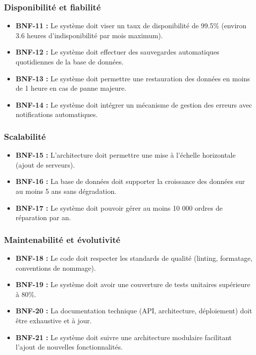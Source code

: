 \subsubsection{Disponibilité et fiabilité}

\begin{itemize}
    \item \textbf{BNF-11 :} Le système doit viser un taux de disponibilité de 99.5\% (environ 3.6 heures d'indisponibilité par mois maximum).
    
    \item \textbf{BNF-12 :} Le système doit effectuer des sauvegardes automatiques quotidiennes de la base de données.
    
    \item \textbf{BNF-13 :} Le système doit permettre une restauration des données en moins de 1 heure en cas de panne majeure.
    
    \item \textbf{BNF-14 :} Le système doit intégrer un mécanisme de gestion des erreurs avec notifications automatiques.
\end{itemize}

\subsubsection{Scalabilité}

\begin{itemize}
    \item \textbf{BNF-15 :} L'architecture doit permettre une mise à l'échelle horizontale (ajout de serveurs).
    
    \item \textbf{BNF-16 :} La base de données doit supporter la croissance des données sur au moins 5 ans sans dégradation.
    
    \item \textbf{BNF-17 :} Le système doit pouvoir gérer au moins 10 000 ordres de réparation par an.
\end{itemize}

\subsubsection{Maintenabilité et évolutivité}

\begin{itemize}
    \item \textbf{BNF-18 :} Le code doit respecter les standards de qualité (linting, formatage, conventions de nommage).
    
    \item \textbf{BNF-19 :} Le système doit avoir une couverture de tests unitaires supérieure à 80\%.
    
    \item \textbf{BNF-20 :} La documentation technique (API, architecture, déploiement) doit être exhaustive et à jour.
    
    \item \textbf{BNF-21 :} Le système doit suivre une architecture modulaire facilitant l'ajout de nouvelles fonctionnalités.
\end{itemize}

